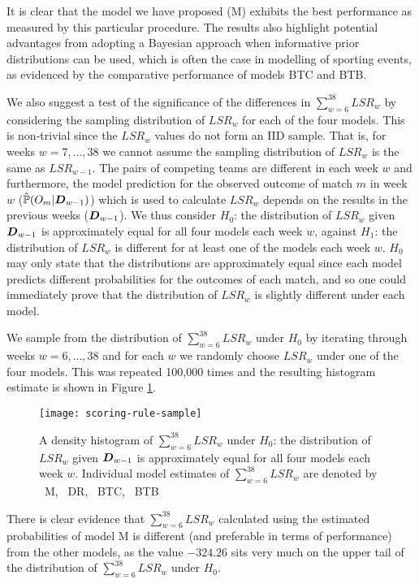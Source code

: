 It is clear that the model we have proposed (M) exhibits the best performance as measured by this particular procedure.
The results also highlight potential advantages from adopting a Bayesian approach when informative prior distributions
can be used, which is often the case in modelling of sporting events, as evidenced by the comparative performance of
models BTC and BTB.

We also suggest a test of the significance of the differences in \(\sum_{w=6}^{38} LSR_w\) by considering the sampling
distribution of \(LSR_w\) for each of the four models. This is non-trivial since the \(LSR_w\) values do not form an
\gls{IID} sample. That is, for weeks \(w = 7, \ldots, 38\) we cannot assume the sampling distribution of \(LSR_w\) is
the same as \(LSR_{w-1}\). The pairs of competing teams are different in each week \(w\) and furthermore, the model
prediction for the observed outcome of match \(m\) in week \(w\) (\(\hat{\mathbb{P}}(O_m | \boldsymbol{D}_{w-1})\)) which is used to
calculate \(LSR_w\) depends on the results in the previous weeks (\(\boldsymbol{D}_{w-1}\)). We thus consider \(H_0\): the
distribution of \(LSR_w\) given \(\boldsymbol{D}_{w-1}\) is approximately equal for all four models each week \(w\), against
\(H_1\): the distribution of \(LSR_w\) is different for at least one of the models each week \(w\). \(H_0\) may only
state that the distributions are approximately equal since each model predicts different probabilities for the outcomes
of each match, and so one could immediately prove that the distribution of \(LSR_w\) is slightly different under each
model.

We sample from the distribution of \(\sum_{w=6}^{38} LSR_w\) under \(H_0\) by iterating through weeks \(w = 6, \ldots,
38\) and for each \(w\) we randomly choose \(LSR_w\) under one of the four models. This was repeated 100,000 times and
the resulting histogram estimate is shown in Figure \ref{fig:scoring-rule-sample}.
\begin{figure}[htp]
\begin{center}
\texttt{[image: scoring-rule-sample]}
\caption{A density histogram of \(\sum_{w=6}^{38} LSR_w\) under \(H_0\): the distribution of \(LSR_w\) given
\(\boldsymbol{D}_{w-1}\) is approximately equal for all four models each week \(w\). Individual model estimates of
\(\sum_{w=6}^{38} LSR_w\) are denoted by \protect\blueSolidLine\ M, \protect\redSolidLine\ DR, \protect\greenSolidLine\
BTC, \protect\blackSolidLine\ BTB}
\label{fig:scoring-rule-sample} 
\end{center}
\end{figure}
There is clear evidence that \(\sum_{w=6}^{38} LSR_w\) calculated using the estimated probabilities of model M is
different (and preferable in terms of performance) from the other models, as the value \(-324.26\) sits very much on the
upper tail of the distribution of \(\sum_{w=6}^{38} LSR_w\) under \(H_0\).

